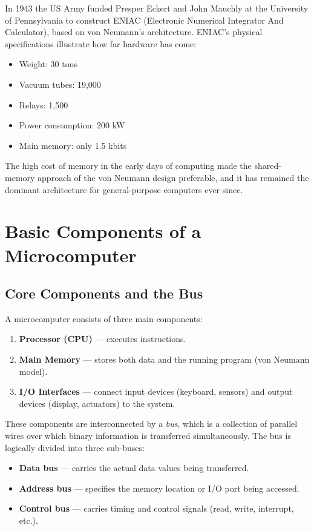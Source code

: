 \documentclass[11pt, a4paper, notitlepage]{report}
\theoremstyle{definition}
\theoremstyle{remark}
\theoremstyle{definition}
\begin{document}
In 1943 the US Army funded Presper Eckert and John Mauchly at the University of Pennsylvania to construct ENIAC (Electronic Numerical Integrator And Calculator), based on von Neumann's architecture. ENIAC's physical specifications illustrate how far hardware has come:

\begin{itemize}
  \item Weight: 30 tons
  \item Vacuum tubes: 19,000
  \item Relays: 1,500
  \item Power consumption: 200 kW
  \item Main memory: only 1.5 kbits
\end{itemize}

The high cost of memory in the early days of computing made the shared-memory approach of the von Neumann design preferable, and it has remained the dominant architecture for general-purpose computers ever since.

\section{Basic Components of a Microcomputer}

\subsection{Core Components and the Bus}

A microcomputer consists of three main components:

\begin{enumerate}
  \item \textbf{Processor (CPU)} --- executes instructions.
  \item \textbf{Main Memory} --- stores both data and the running program (von Neumann model).
  \item \textbf{I/O Interfaces} --- connect input devices (keyboard, sensors) and output devices (display, actuators) to the system.
\end{enumerate}

These components are interconnected by a \emph{bus}, which is a collection of parallel wires over which binary information is transferred simultaneously. The bus is logically divided into three sub-buses:

\begin{itemize}
  \item \textbf{Data bus} --- carries the actual data values being transferred.
  \item \textbf{Address bus} --- specifies the memory location or I/O port being accessed.
  \item \textbf{Control bus} --- carries timing and control signals (read, write, interrupt, etc.).
\end{itemize}
\end{document}
